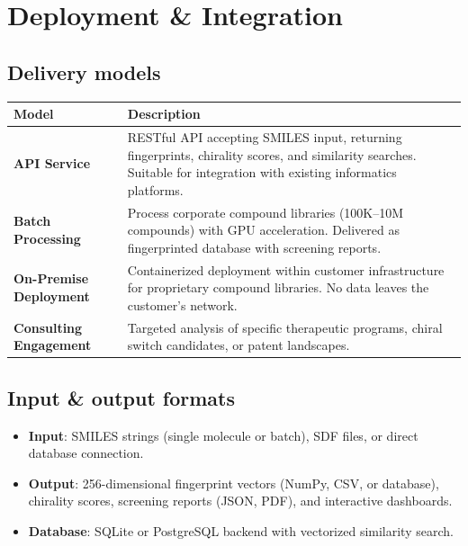 \documentclass[11pt,a4paper]{article}
\begin{document}
\section{Deployment \& Integration}

\subsection{Delivery models}

\begin{center}
\begin{tabularx}{\textwidth}{lX}
\toprule
\textbf{Model} & \textbf{Description} \\
\midrule
\textbf{API Service} & RESTful API accepting SMILES input, returning
  fingerprints, chirality scores, and similarity searches. Suitable for
  integration with existing informatics platforms. \\[6pt]
\textbf{Batch Processing} & Process corporate compound libraries (100K--10M
  compounds) with GPU acceleration. Delivered as fingerprinted database with
  screening reports. \\[6pt]
\textbf{On-Premise Deployment} & Containerized deployment within customer
  infrastructure for proprietary compound libraries. No data leaves the
  customer's network. \\[6pt]
\textbf{Consulting Engagement} & Targeted analysis of specific therapeutic
  programs, chiral switch candidates, or patent landscapes. \\
\bottomrule
\end{tabularx}
\end{center}

\subsection{Input \& output formats}

\begin{itemize}[leftmargin=1.5em]
  \item \textbf{Input}: SMILES strings (single molecule or batch), SDF files,
    or direct database connection.
  \item \textbf{Output}: 256-dimensional fingerprint vectors (NumPy, CSV, or
    database), chirality scores, screening reports (JSON, PDF), and
    interactive dashboards.
  \item \textbf{Database}: SQLite or PostgreSQL backend with vectorized
    similarity search.
\end{itemize}
\end{document}
